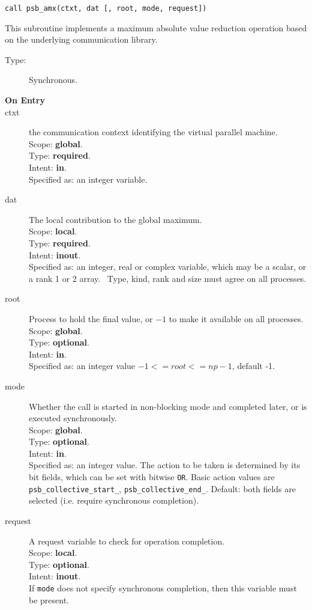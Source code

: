 \begin{verbatim}
call psb_amx(ctxt, dat [, root, mode, request])
\end{verbatim}

This subroutine implements a maximum absolute value reduction
operation based on the underlying communication library. 
\begin{description}
\item[Type:] Synchronous.
\item[\bf  On Entry ]
\item[ctxt] the communication context identifying the virtual
  parallel machine.\\
Scope: {\bf global}.\\
Type: {\bf required}.\\
Intent: {\bf in}.\\
Specified as: an integer variable.
\item[dat] The local contribution to the global maximum.\\
Scope: {\bf local}.\\
Type: {\bf required}.\\
Intent: {\bf inout}.\\
Specified as: an integer, real or complex variable, which may be a
scalar, or a rank 1 or 2 array. \
Type, kind, rank and size must agree on all processes.
\item[root] Process to hold the final value, or $-1$ to make it available
  on all processes.\\
Scope: {\bf global}.\\
Type: {\bf optional}.\\
Intent: {\bf in}.\\
Specified as: an integer value $-1<= root <= np-1$, default -1. \\
\item[mode] Whether the call is started in non-blocking mode and completed
  later, or is executed synchronously.\\
Scope: {\bf global}.\\
Type: {\bf optional}.\\
Intent: {\bf in}.\\
Specified as: an integer value. The action to be taken is determined
by its bit fields, which can be set with bitwise \verb|OR|. Basic
action values are \verb|psb_collective_start_|, \verb|psb_collective_end_|.
Default:  both fields are selected (i.e. require synchronous completion).\\
\item[request] A request variable to check for operation completion.\\
Scope: {\bf local}.\\
Type: {\bf optional}.\\
Intent: {\bf inout}.\\
If \verb|mode| does not specify synchronous completion, then this
variable must be present.
\end{description}


